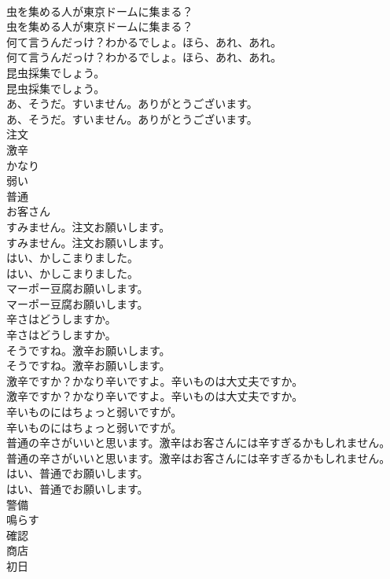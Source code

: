 \documentclass[8pt]{extreport}
\begin{document}
\begin{CJK}{UTF8}{min}
\\	虫を集める人が東京ドームに集まる？	
\\	虫を集める人が東京ドームに集まる？ 
\\	何て言うんだっけ？わかるでしょ。ほら、あれ、あれ。	
\\	何て言うんだっけ？わかるでしょ。ほら、あれ、あれ。 
\\	昆虫採集でしょう。	
\\	昆虫採集でしょう。 
\\	あ、そうだ。すいません。ありがとうございます。	
\\	あ、そうだ。すいません。ありがとうございます。 
\\	注文
\\	激辛
\\	かなり
\\	弱い
\\	普通
\\	お客さん
\\	すみません。注文お願いします。	
\\	すみません。注文お願いします。 
\\	はい、かしこまりました。	
\\	はい、かしこまりました。 
\\	マーポー豆腐お願いします。	
\\	マーポー豆腐お願いします。 
\\	辛さはどうしますか。	
\\	辛さはどうしますか。 
\\	そうですね。激辛お願いします。	
\\	そうですね。激辛お願いします。 
\\	激辛ですか？かなり辛いですよ。辛いものは大丈夫ですか。	
\\	激辛ですか？かなり辛いですよ。辛いものは大丈夫ですか。 
\\	辛いものにはちょっと弱いですが。	
\\	辛いものにはちょっと弱いですが。 
\\	普通の辛さがいいと思います。激辛はお客さんには辛すぎるかもしれません。	
\\	普通の辛さがいいと思います。激辛はお客さんには辛すぎるかもしれません。 
\\	はい、普通でお願いします。	
\\	はい、普通でお願いします。 
\\	警備
\\	鳴らす
\\	確認
\\	商店
\\	初日

\end{CJK}
\end{document}
